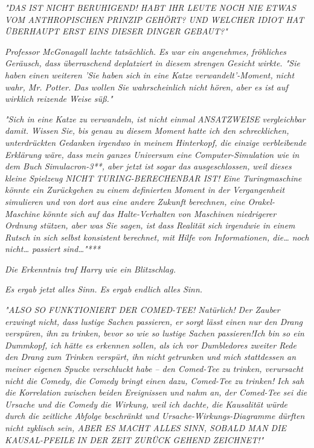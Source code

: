 {\emph{"\emph{DAS IST NICHT BERUHIGEND! HABT IHR LEUTE NOCH NIE ETWAS VOM ANTHROPISCHEN PRINZIP}} \emph{\emph{GEHÖRT? UND WELCHER IDIOT HAT ÜBERHAUPT ERST EINS DIESER DINGER GEBAUT?}"}

\emph{Professor McGonagall lachte tatsächlich. Es war ein angenehmes, fröhliches Geräusch, dass überraschend deplatziert in diesem strengen Gesicht wirkte. "Sie haben einen weiteren 'Sie haben sich in eine Katze verwandelt'-Moment, nicht wahr, Mr. Potter. Das wollen Sie wahrscheinlich nicht hören, aber es ist auf wirklich reizende Weise süß."}

\emph{"Sich in eine Katze zu verwandeln, ist nicht einmal} \emph{\emph{ANSATZWEISE}} \emph{vergleichbar damit. Wissen Sie, bis genau zu diesem Moment hatte ich den schrecklichen, unterdrückten Gedanken irgendwo in meinem Hinterkopf, die einzige verbleibende Erklärung wäre, dass mein ganzes Universum eine Computer-Simulation wie in dem Buch} \emph{\emph{Simulacron-3}**, aber jetzt ist} \emph{\emph{sogar das ausgeschlossen,}} \emph{weil dieses kleine Spielzeug} \emph{\emph{NICHT TURING-BERECHENBAR IST!}} \emph{Eine Turingmaschine könnte ein Zurückgehen zu einem definierten Moment in der Vergangenheit simulieren und von dort aus eine andere Zukunft berechnen, eine Orakel-Maschine könnte sich auf das Halte-Verhalten von Maschinen niedrigerer Ordnung stützen, aber was Sie sagen, ist dass Realität sich irgendwie in einem Rutsch in sich selbst konsistent berechnet, mit Hilfe von Informationen, die… noch nicht… passiert sind…"***}

\emph{Die Erkenntnis traf Harry wie ein Blitzschlag.}

\emph{Es ergab jetzt alles Sinn. Es ergab} \emph{\emph{endlich}} \emph{alles Sinn.}

\emph{"\emph{ALSO SO FUNKTIONIERT DER COMED-TEE! Natürlich!}} \emph{Der Zauber} \emph{\emph{erzwingt}} \emph{nicht, dass lustige Sachen passieren, er sorgt lässt einen nur} \emph{\emph{den Drang verspüren, ihn zu trinken,}} \emph{bevor so wie so lustige Sachen passieren!Ich bin so ein Dummkopf, ich hätte es erkennen sollen, als ich vor Dumbledores zweiter Rede den Drang zum Trinken verspürt, ihn} \emph{\emph{nicht}} \emph{getrunken und mich stattdessen an meiner eigenen Spucke verschluckt habe -- den Comed-Tee zu trinken, verursacht nicht die Comedy, die Comedy bringt einen dazu, Comed-Tee zu trinken! Ich sah die Korrelation zwischen beiden Ereignissen und nahm an, der Comed-Tee sei die Ursache und die Comedy die Wirkung, weil ich dachte, die Kausalität würde durch die zeitliche Abfolge beschränkt und Ursache-Wirkungs-Diagramme dürften nicht zyklisch sein, ABER ES MACHT ALLES SINN, SOBALD MAN DIE KAUSAL-PFEILE} \emph{\emph{IN DER ZEIT ZURÜCK}} \emph{GEHEND ZEICHNET!"}

}

